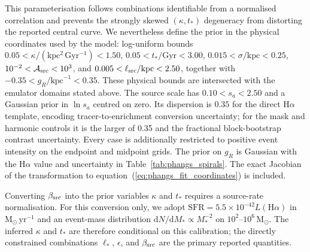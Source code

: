 \documentclass[fleqn,usenatbib]{mnras}
\newcommand{\dd}{\mathrm{d}}
\begin{document}
This parameterisation follows combinations identifiable from a normalised correlation and prevents the strongly skewed $(\kappa,t_\ast)$ degeneracy from distorting the reported central curve.  We nevertheless define the prior in the physical coordinates used by the model: log-uniform bounds $0.05<\kappa/(\mathrm{kpc^2\,Gyr^{-1}})<1.50$, $0.05<t_\ast/\mathrm{Gyr}<3.00$, $0.015<\sigma/\mathrm{kpc}<0.25$, $10^{-2}<{\cal A}_{\rm src}<10^3$, and $0.005<\ell_{\rm src}/\mathrm{kpc}<2.50$, together with $-0.35<g_R/\mathrm{kpc}^{-1}<0.35$.  These physical bounds are intersected with the emulator domains stated above.  The source scale has $0.10<s_a<2.50$ and a Gaussian prior in $\ln s_a$ centred on zero.  Its dispersion is $0.35$ for the direct H$\alpha$ template, encoding tracer-to-enrichment conversion uncertainty; for the mask and harmonic controls it is the larger of 0.35 and the fractional block-bootstrap contrast uncertainty.  Every case is additionally restricted to positive event intensity on the endpoint and midpoint grids.  The prior on $g_R$ is Gaussian with the H$\alpha$ value and uncertainty in Table~\ref{tab:phangs_spirals}.  The exact Jacobian of the transformation to equation~(\ref{eq:phangs_fit_coordinates}) is included.

Converting $\beta_{\rm src}$ into the prior variables $\kappa$ and $t_\ast$ requires a source-rate normalisation.  For this conversion only, we adopt $\mathrm{SFR}=5.5\times10^{-42}L(\mathrm{H}\alpha)$ in $\mathrm{M_\odot\,yr^{-1}}$ \citep{KennicuttEvans2012} and an event-mass distribution $\dd N/\dd M_\ast\propto M_\ast^{-2}$ on $10^2$--$10^6\,\mathrm{M_\odot}$.  The inferred $\kappa$ and $t_\ast$ are therefore conditional on this calibration; the directly constrained combinations $\ell_\ast$, $\epsilon$, and $\beta_{\rm src}$ are the primary reported quantities.
\end{document}
